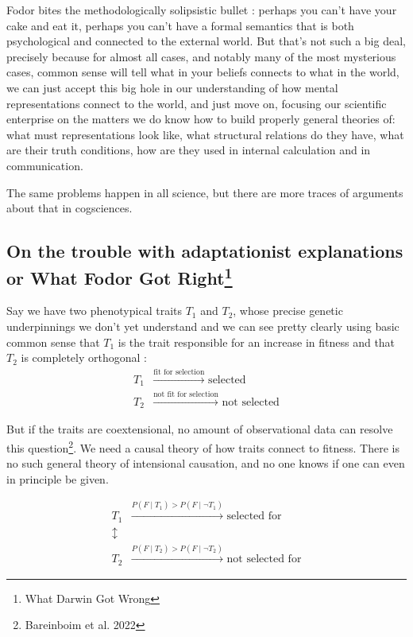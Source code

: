 \documentclass{cours}
\begin{document}
Fodor bites the methodologically solipsistic bullet : perhaps you can't have your cake and eat it, perhaps you can't have a formal semantics that is both psychological and connected to the external world. But that's not such a big deal, precisely because for almost all cases, and notably many of the most mysterious cases, common sense will tell what in your beliefs connects to what in the world, we can just accept this big hole in our understanding of how mental representations connect to the world, and just move on, focusing our scientific enterprise on the matters we do know how to build properly general theories of: what must representations look like, what structural relations do they have, what are their truth conditions, how are they used in internal calculation and in communication.

The same problems happen in all science, but there are more traces of arguments about that in cogsciences.

\subsection[On the trouble with adaptationist explanations or What Fodor Got Right]{On the trouble with adaptationist explanations or What Fodor Got Right\footnote{What Darwin Got Wrong}}
Say we have two phenotypical traits $T_{1}$ and $T_{2}$, whose precise genetic underpinnings we don't yet understand and we can see pretty clearly using basic common sense that $T_{1}$ is the trait responsible for an increase in fitness and that $T_{2}$ is completely orthogonal :
\[
  \begin{aligned}
      T_{1} &\xrightarrow{\text{fit for selection}} \text{ selected} \\
      T_{2} &\xrightarrow{\text{not fit for selection}} \text{ not selected}
  \end{aligned}
\]

But if the traits are coextensional, no amount of observational data can resolve this question\footnote{Bareinboim et al. 2022}. We need a causal theory of how traits connect to fitness. There is no such general theory of intensional causation, and no one knows if one can even in principle be given.

\[
    \begin{aligned}
        T_{1} & \xrightarrow{P(F\mid T_{1}) > P(F\mid \lnot T_{1})} \text{ selected for}\\
        \updownarrow & \\
        T_{2} & \xrightarrow{P(F\mid T_{2}) > P(F\mid \lnot T_{2})} \text{ not selected for}
    \end{aligned}    
\]
\end{document}
